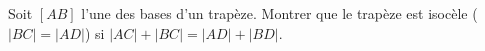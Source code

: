 Soit $[AB]$ l'une des bases d'un trapèze. Montrer que le trapèze est isocèle ($|BC| = |AD|$) si $|AC| + |BC| = |AD| + |BD|$.
